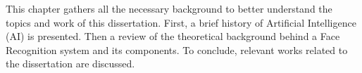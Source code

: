 \documentclass[class=report, crop=false, a4paper, 12pt]{standalone}
\begin{document}
This chapter gathers all the necessary background to better understand the topics and work of this dissertation. First, a brief history of Artificial Intelligence (AI) is presented. Then a review of the theoretical background behind a Face Recognition system and its components. To conclude, relevant works related to the dissertation are discussed.


%
\end{document}
